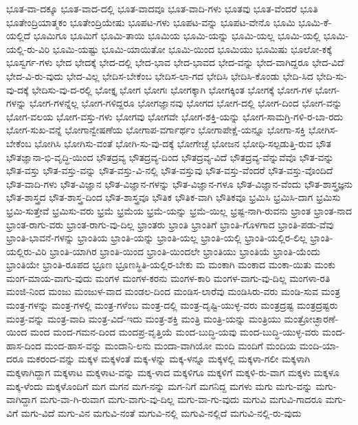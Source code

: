 {ಭೂತ-ವಾ-ದಕ್ಕೂ
ಭೂತ-ವಾದ-ದಲ್ಲಿ
ಭೂತ-ವಾದವೂ
ಭೂತ-ವಾದಿ-ಗಳು
ಭೂತವು
ಭೂತ-ವೆಂದರೆ
ಭೂತಿ
ಭೂತೇಂದ್ರಿಯಾತ್ಮಕಂ
ಭೂತೇಂದ್ರಿಯೇಷು
ಭೂಪಟ-ಗಳು
ಭೂಪಟ-ವನ್ನು
ಭೂಪಟ-ವೇನೊ
ಭೂಮಿ
ಭೂಮಿ-ಕೆ-ಯಲ್ಲಿದೆ
ಭೂಮಿಗೂ
ಭೂಮಿಗೆ
ಭೂಮಿ-ತಾಯಿ
ಭೂಮಿಯ
ಭೂಮಿ-ಯನ್ನು
ಭೂಮಿ-ಯಲ್ಲ
ಭೂಮಿ-ಯಲ್ಲಿ
ಭೂಮಿ-ಯಲ್ಲಿ-ರು-ವಿರಿ
ಭೂಮಿ-ಯಷ್ಟು
ಭೂಮಿ-ಯಾಯಿತೋ
ಭೂಮಿ-ಯಿಂದ
ಭೂಮಿಯು
ಭೂಮಿಷು
ಭೂಲೋ-ಕಕ್ಕೆ
ಭೂಸ್ವರ್ಗ-ಗಳು
ಭೇದ
ಭೇದಕ್ಕೆ
ಭೇದ-ದಲ್ಲಿ
ಭೇದ-ಭಾವ
ಭೇದ-ಭಾವದ
ಭೇದ-ವನ್ನು
ಭೇದ-ವಾಗಿದ್ದರೂ
ಭೇದ-ವಿದೆ
ಭೇದ-ವಿ-ರು-ವುದು
ಭೇದ-ವಿಲ್ಲ
ಭೇದಿಸ-ಬೇಕೆಂಬ
ಭೇದಿಸ-ಲಾ-ಗದ
ಭೇದಿಸಿ
ಭೇದಿಸಿ-ಕೊಂಡು
ಭೇದಿ-ಸಿದ
ಭೇದಿ-ಸು-ವು-ದಕ್ಕೆ
ಭೇದಿಸು-ವು-ದ-ರಲ್ಲಿ
ಭೋಕ್ತೃ
ಭೋಗ
ಭೋಗಃ
ಭೋಗಕ್ಕಾಗಿ
ಭೋಗಕ್ಕಿಂತ
ಭೋಗಕ್ಕೆ
ಭೋಗ-ಗಳ
ಭೋಗ-ಗಳನ್ನು
ಭೋಗ-ಗಳನ್ನೆಲ್ಲ
ಭೋಗ-ಗಳಿದ್ದರೂ
ಭೋಗಜ್ಞಾನವು
ಭೋಗದ
ಭೋಗ-ದಲ್ಲಿ
ಭೋಗ-ದಿಂದ
ಭೋಗ-ವನ್ನು
ಭೋಗ-ವಲಯ
ಭೋಗ-ವಸ್ತು-ಗಳು
ಭೋಗವು
ಭೋಗವೇ
ಭೋಗ-ಶಕ್ತಿ-ಯನ್ನು
ಭೋಗ-ಸಾಮಗ್ರಿ-ಗಳಿ-ರ-ಬಾ-ರದು
ಭೋಗ-ಸುಖ-ವನ್ನೆ
ಭೋಗಾನ್ವೇಷಣೆಯ
ಭೋಗಾಪ-ವರ್ಗಾರ್ಥಂ
ಭೋಗಾಪೇಕ್ಷೆ-ಯನ್ನೂ
ಭೋಗಾ-ಸಕ್ತಿ
ಭೋಗಿಸ-ಬೇಕೆಂಬ
ಭೋಗಿಸಿ
ಭೋಗಿಸು-ವಂತೆ
ಭೋಗಿ-ಸು-ವು-ದಕ್ಕೆ
ಭೋಗೇಚ್ಛೆ
ಭೋಜನ
ಭೋಧಿ-ಸಲ್ಪಡುತ್ತಿ-ರುವ
ಭೌತ
ಭೌತಜ್ಞಾನಾ-ಭಿ-ವೃದ್ಧಿ-ಯಿಂದ
ಭೌತದ್ರವ್ಯ
ಭೌತದ್ರವ್ಯ-ದಿಂದ
ಭೌತದ್ರವ್ಯ-ವಿದೆ
ಭೌತದ್ರವ್ಯ-ವೆನ್ನುವೆವೊ
ಭೌತ-ವನ್ನು
ಭೌತ-ವಸ್ತು
ಭೌತ-ವಸ್ತು-ವನ್ನು
ಭೌತ-ವಸ್ತು-ವಿ-ನಲ್ಲಿ
ಭೌತ-ವಸ್ತುವು
ಭೌತ-ವಸ್ತು-ವೆಂದರೆ
ಭೌತ-ವಸ್ತು-ವೊಂದಿದೆ
ಭೌತ-ವಾದಿ-ಗಳು
ಭೌತ-ವಿಜ್ಞಾನ
ಭೌತ-ವಿಜ್ಞಾನ-ಗಳನ್ನು
ಭೌತ-ವಿಜ್ಞಾನ-ಗಳೂ
ಭೌತ-ವಿಜ್ಞಾನ-ವೆಂದು
ಭೌತ-ಶಾಸ್ತ್ರಜ್ಞನು
ಭೌತ-ಶಾಸ್ತ್ರದ
ಭೌತ-ಶಾಸ್ತ್ರ-ದಿಂದ
ಭೌತ-ಶಾಸ್ತ್ರವೂ
ಭೌತಿಕ
ಭೌತಿಕ-ವಾಗಿ
ಭೌತಿಕವೂ
ಭ್ರಮಿಸಿ
ಭ್ರಮಿಸಿ-ದಾಗ
ಭ್ರಮಿಸು
ಭ್ರಮಿ-ಸುತ್ತೇವೆ
ಭ್ರಮಿಸು-ವರು
ಭ್ರಮೆ
ಭ್ರಮೆಯ
ಭ್ರಮೆ-ಯನ್ನು
ಭ್ರಮೆ-ಯಿಲ್ಲ
ಭ್ರಷ್ಟ-ನಾಗಿ-ರುವನು
ಭ್ರಾಂತ
ಭ್ರಾಂತ-ನಾದ
ಭ್ರಾಂತ-ರಾಗು-ವರು
ಭ್ರಾಂತ-ರಾಗು-ವು-ದಿಲ್ಲ
ಭ್ರಾಂತರು
ಭ್ರಾಂತಿ
ಭ್ರಾಂತಿಗೆ
ಭ್ರಾಂತಿ-ಗೊಳಗಾದ
ಭ್ರಾಂತಿ-ಪಡು-ವೆವು
ಭ್ರಾಂತಿ-ಭಾವನೆ-ಗಳನ್ನು
ಭ್ರಾಂತಿಯ
ಭ್ರಾಂತಿ-ಯನ್ನು
ಭ್ರಾಂತಿ-ಯಲ್ಲ
ಭ್ರಾಂತಿ-ಯಲ್ಲಿ
ಭ್ರಾಂತಿ-ಯಲ್ಲಿರ-ಲಿಲ್ಲ
ಭ್ರಾಂತಿ-ಯಲ್ಲಿರು-ವಿರಿ
ಭ್ರಾಂತಿ-ಯಾಗಿರ
ಭ್ರಾಂತಿ-ಯಿಂದ
ಭ್ರಾಂತಿ-ಯಿಂದಲೇ
ಭ್ರಾಂತಿಯು
ಭ್ರಾಂತಿಯೆ
ಭ್ರಾಂತಿ-ಯೆಂದು
ಭ್ರಾಂತಿಯೇ
ಭ್ರಾಂತಿ-ರೂಪದ
ಭ್ರೂಣ
ಭ್ರೂಣಸ್ಥಿತಿ-ಯಲ್ಲಿರ-ಬೇಕು
ಮ
ಮಂಕಾಗಿ
ಮಂಕಾದ
ಮಂಕಾ-ಯಿತು
ಮಂಕು
ಮಂಗ-ಮಾಯ-ವಾಗು-ವುದು
ಮಂಗಳ
ಮಂಗಳ-ಕರನು
ಮಂಗಳ-ಕಾರಿ
ಮಂಗಳ-ವಾಗು-ವು-ದಿಲ್ಲ
ಮಂಗಳಾ-ರತಿ
ಮಂಜಿ-ನಿಂದ
ಮಂಜು
ಮಂಜುಳ-ವಾದ
ಮಂಡಲ-ದಿಂದ
ಮಂಡಿಸ-ಲಾರೆವು
ಮಂಡಿಸಿರು-ವರು
ಮಂಡಿ-ಸುವ
ಮಂತ್ರ
ಮಂತ್ರ-ಗಳನ್ನು
ಮಂತ್ರ-ಗಳಲ್ಲಿ
ಮಂತ್ರ-ಗಳೆಂಬ
ಮಂತ್ರ-ದಲ್ಲಿ
ಮಂತ್ರ-ದೃಷ್ಟಿ-ಯುಳ್ಳ-ವರು
ಮಂತ್ರದ್ರಷ್ಟ
ಮಂತ್ರದ್ರಷ್ಟರು
ಮಂತ್ರ-ವನ್ನು
ಮಂತ್ರ-ವಾದಿ
ಮಂತ್ರ-ವಿದೆ-ಇದು
ಮಂತ್ರ-ಶಕ್ತಿ
ಮಂತ್ರಿ
ಮಂತ್ರಿ-ಯನ್ನು
ಮಂತ್ರಿಯು
ಮಂತ್ರೋಚ್ಛಾರಣೆ-ಯಿಂದ
ಮಂದ
ಮಂದ-ಗಮನ-ದಿಂದ
ಮಂದಪ್ರ-ವೃತ್ತಿಯೆ
ಮಂದ-ಬುದ್ಧಿ-ಯವು
ಮಂದ-ಬುದ್ಧಿ-ಯುಳ್ಳ-ವರು
ಮಂದ-ಹಾಸ-ದಿಂದ
ಮಂದ-ಹಾಸ-ವನ್ನು
ಮಂದಾನಿ-ಲನು
ಮಂದಾ-ವಾಗಿಯೋ
ಮಂದಿ
ಮಂದಿಗೆ
ಮಂದಿಯ
ಮಂದಿ-ಯಾ-ದರೂ
ಮಕರಂದ-ವನ್ನು
ಮಕ್ಕಳ
ಮಕ್ಕಳಂತೆ
ಮಕ್ಕ-ಳನ್ನು
ಮಕ್ಕ-ಳನ್ನೂ
ಮಕ್ಕಳಲ್ಲಿ
ಮಕ್ಕಳಾ-ಗಲೀ
ಮಕ್ಕಳಾಗಿ
ಮಕ್ಕಳಾಗಿದ್ದಾಗ
ಮಕ್ಕಳಾಟ
ಮಕ್ಕಳಾಟ-ವನ್ನು
ಮಕ್ಕ-ಳಾದ
ಮಕ್ಕಳಿಗೂ
ಮಕ್ಕಳಿಗೆ
ಮಕ್ಕಳಿ-ರು-ವಾಗ
ಮಕ್ಕಳು
ಮಕ್ಕಳೂ
ಮಕ್ಕ-ಳೆಂದು
ಮಕ್ಕಳೊಂದಿಗೆ
ಮಗ
ಮಗನ
ಮಗ-ನನ್ನು
ಮಗ-ನಿಗೆ
ಮಗನಿದ್ದ
ಮಗಳು
ಮಗು
ಮಗು-ವನ್ನು
ಮಗು-ವಾಗಿದ್ದಾಗ
ಮಗು-ವಾ-ಗಿ-ರುವಾಗ
ಮಗು-ವಾಗು-ವು-ದಿಲ್ಲ
ಮಗು-ವಾ-ಗು-ವುದು
ಮಗುವಿ
ಮಗುವಿ-ಗಾದರೂ
ಮಗು-ವಿಗೆ
ಮಗು-ವಿದೆ
ಮಗು-ವಿನ
ಮಗುವಿ-ನಂತೆ
ಮಗುವಿ-ನಲ್ಲಿ
ಮಗುವಿ-ನಲ್ಲಿದೆ
ಮಗುವಿ-ನಲ್ಲಿ-ರು-ವುದು
}
